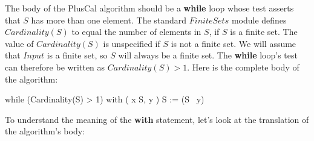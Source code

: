\documentclass[fleqn,leqno]{article}
\begin{document}
The body of the PlusCal algorithm should be a \textbf{while} loop
whose test asserts that $S$ has more than one element.  The standard
$FiniteSets$ module defines
  $Cardinality(S)$ to equal the
number of elements in $S$, if $S$ is a finite set.  The value of
$Cardinality(S)$ is unspecified if $S$ is not a finite set.  
We will assume that $Input$ is a finite set, so $S$ will always
be a finite set.  The \textbf{while} loop's test can therefore
be written as $Cardinality(S) > 1$.  Here is the complete
body of the algorithm:%
\begin{display}
\begin{nopcal}
while (Cardinality(S) > 1) 
  {  with (  x \in S,  y   ) 
       {  S := (S \ {y})   }
  }
\end{nopcal}
\begin{tlatex}
%
%
\end{tlatex}
\end{display}
To understand the meaning of the \textbf{with} statement, let's look at
the translation of the algorithm's body:
\end{document}

